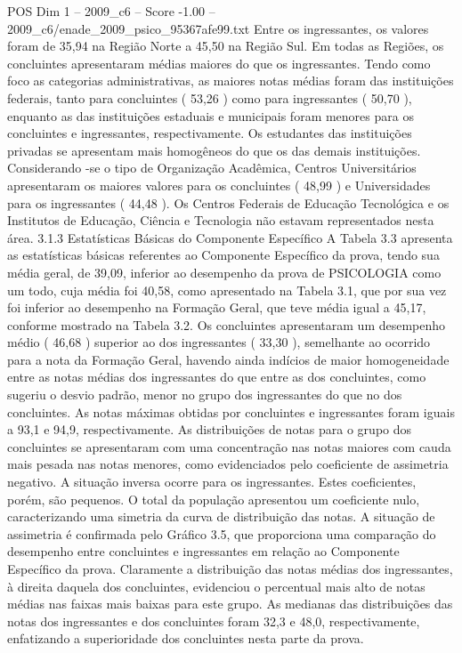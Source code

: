 \begin{textsample}{POS Dim 1 – 2009\_c6 – Score -1.00 – 2009\_c6/enade\_2009\_psico\_95367afe99.txt}
Entre os ingressantes, os valores foram de 35,94 na Região Norte a 45,50 na Região Sul.
Em todas as Regiões, os concluintes apresentaram médias maiores do que os ingressantes.
Tendo como foco as categorias administrativas, as maiores notas médias foram das instituições federais, tanto para concluintes ( 53,26 ) como para ingressantes ( 50,70 ), enquanto as das instituições estaduais e municipais foram menores para os concluintes e ingressantes, respectivamente.
Os estudantes das instituições privadas se apresentam mais homogêneos do que os das demais instituições.
Considerando -se o tipo de Organização Acadêmica, Centros Universitários apresentaram os maiores valores para os concluintes ( 48,99 ) e Universidades para os ingressantes ( 44,48 ).
Os Centros Federais de Educação Tecnológica e os Institutos de Educação, Ciência e Tecnologia não estavam representados nesta área. 3.1.3 Estatísticas Básicas do Componente Específico A Tabela 3.3 apresenta as estatísticas básicas referentes ao Componente Específico da prova, tendo sua média geral, de 39,09, inferior ao desempenho da prova de PSICOLOGIA como um todo, cuja média foi 40,58, como apresentado na Tabela 3.1, que por sua vez foi inferior ao desempenho na Formação Geral, que teve média igual a 45,17, conforme mostrado na Tabela 3.2.
Os concluintes apresentaram um desempenho médio ( 46,68 ) superior ao dos ingressantes ( 33,30 ), semelhante ao ocorrido para a nota da Formação Geral, havendo ainda indícios de maior homogeneidade entre as notas médias dos ingressantes do que entre as dos concluintes, como sugeriu o desvio padrão, menor no grupo dos ingressantes do que no dos concluintes.
As notas máximas obtidas por concluintes e ingressantes foram iguais a 93,1 e 94,9, respectivamente.
As distribuições de notas para o grupo dos concluintes se apresentaram com uma concentração nas notas maiores com cauda mais pesada nas notas menores, como evidenciados pelo coeficiente de assimetria negativo.
A situação inversa ocorre para os ingressantes.
Estes coeficientes, porém, são pequenos.
O total da população apresentou um coeficiente nulo, caracterizando uma simetria da curva de distribuição das notas.
A situação de assimetria é confirmada pelo Gráfico 3.5, que proporciona uma comparação do desempenho entre concluintes e ingressantes em relação ao Componente Específico da prova.
Claramente a distribuição das notas médias dos ingressantes, à direita daquela dos concluintes, evidenciou o percentual mais alto de notas médias nas faixas mais baixas para este grupo.
As medianas das distribuições das notas dos ingressantes e dos concluintes foram 32,3 e 48,0, respectivamente, enfatizando a superioridade dos concluintes nesta parte da prova.

\end{textsample}
